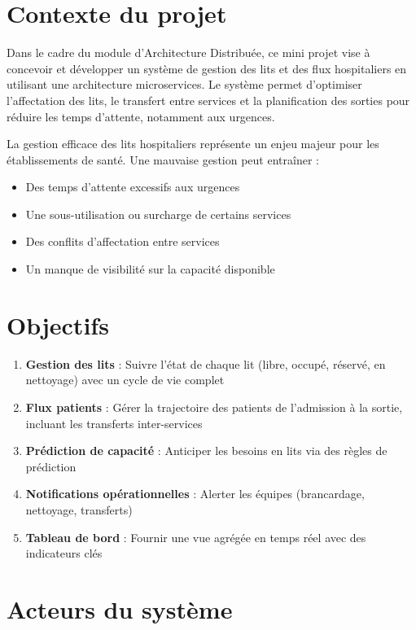 \documentclass[12pt,a4paper]{report}
\begin{document}
\section{Contexte du projet}

Dans le cadre du module d'Architecture Distribu\'ee, ce mini projet vise \`a concevoir et d\'evelopper un syst\`eme de gestion des lits et des flux hospitaliers en utilisant une architecture microservices. Le syst\`eme permet d'optimiser l'affectation des lits, le transfert entre services et la planification des sorties pour r\'eduire les temps d'attente, notamment aux urgences.

La gestion efficace des lits hospitaliers repr\'esente un enjeu majeur pour les \'etablissements de sant\'e. Une mauvaise gestion peut entra\^iner :
\begin{itemize}
    \item Des temps d'attente excessifs aux urgences
    \item Une sous-utilisation ou surcharge de certains services
    \item Des conflits d'affectation entre services
    \item Un manque de visibilit\'e sur la capacit\'e disponible
\end{itemize}

\section{Objectifs}

\begin{enumerate}
    \item \textbf{Gestion des lits} : Suivre l'\'etat de chaque lit (libre, occup\'e, r\'eserv\'e, en nettoyage) avec un cycle de vie complet
    \item \textbf{Flux patients} : G\'erer la trajectoire des patients de l'admission \`a la sortie, incluant les transferts inter-services
    \item \textbf{Pr\'ediction de capacit\'e} : Anticiper les besoins en lits via des r\`egles de pr\'ediction
    \item \textbf{Notifications op\'erationnelles} : Alerter les \'equipes (brancardage, nettoyage, transferts)
    \item \textbf{Tableau de bord} : Fournir une vue agr\'eg\'ee en temps r\'eel avec des indicateurs cl\'es
\end{enumerate}

\section{Acteurs du syst\`eme}
\end{document}

